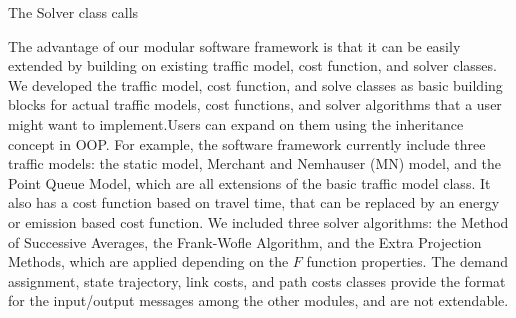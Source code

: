 The Solver class calls 

The advantage of our modular software framework is that it can be easily extended by building on existing traffic model, cost function, and solver classes. We developed the traffic model, cost function, and solve classes as basic building blocks for actual traffic models, cost functions, and solver algorithms that a user might want to implement.Users can expand on them using the inheritance concept in OOP. For example, the software framework currently include three traffic models: the static model, Merchant and Nemhauser (MN) model, and the Point Queue Model, which are all extensions of the basic traffic model class. It also has a cost function based on travel time, that can be replaced by an energy or emission based cost function. We included three solver algorithms: the Method of Successive Averages, the Frank-Wofle Algorithm, and the Extra Projection Methods, which are applied depending on the $F$ function properties. The demand assignment, state trajectory, link costs, and path costs classes provide the format for the input/output messages among the other modules, and are not extendable.  